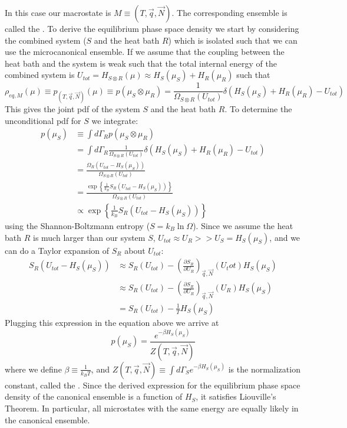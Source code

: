 \documentclass[12pt, a4paper, oneside, openright, titlepage]{book}
\begin{document}
In this case our macrostate is $M \equiv (T,\vec{q},\vec{N})$. The corresponding ensemble is called the . To derive the equilibrium phase space density we start by considering the combined system ($S$ and the heat bath $R$) which is isolated such that we can use the microcanonical ensemble. If we assume that the coupling between the heat bath and the system is weak such that the total internal energy of the combined system is $U_{tot} = H_{S\otimes R}(\mu) \approx H_S(\mu_S) + H_R(\mu_R)$ such that \begin{equation*}
    \rho_{eq,M}(\mu) \equiv p_{(T,\vec{q},\vec{N})}(\mu) \equiv p(\mu_S\otimes\mu_R) = \frac{1}{\Omega_{S\otimes R}(U_{tot})}\delta(H_S(\mu_S)+H_R(\mu_R)-U_{tot})
\end{equation*}
This gives the joint pdf of the system $S$ and the heat bath $R$. To determine the unconditional pdf for $S$ we integrate: \begin{align*}
    p(\mu_S) &\equiv \int d\Gamma_Rp(\mu_S\otimes\mu_R) \\
    &= \int d\Gamma_R \frac{1}{\Omega_{S\otimes R}(U_{tot})}\delta(H_S(\mu_S)+H_R(\mu_R)-U_{tot}) \\
    &= \frac{\Omega_R(U_{tot} - H_S(\mu_S))}{\Omega_{S\otimes R}(U_{tot})} \\ 
    &= \frac{\exp\left\{\frac{1}{k_B}S_R(U_{tot}-H_S(\mu_S))\right\}}{\Omega_{S\otimes R}(U_{tot})}  \\
    &\propto\exp\left\{\frac{1}{k_B}S_R(U_{tot}-H_S(\mu_S))\right\}
\end{align*}
using the Shannon-Boltzmann entropy ($S = k_B\ln\Omega$). Since we assume the heat bath $R$ is much larger than our system $S$, $U_{tot} \approx U_R >> U_S = H_S(\mu_S)$, and we can do a Taylor expansion of $S_R$ about $U_{tot}$: \begin{align*}
    S_R(U_{tot}-H_S(\mu_S)) &\approx S_R(U_{tot}) - \left(\frac{\partial S_R}{\partial U_R}\right)_{\vec{q},\vec{N}}(U_tot) H_S(\mu_S) \\
    &\approx S_R(U_{tot}) - \left(\frac{\partial S_R}{\partial U_R}\right)_{\vec{q},\vec{N}}(U_R)H_S(\mu_S) \\
    &= S_R(U_{tot}) - \frac{1}{T}H_S(\mu_S)
\end{align*}
Plugging this expression in the equation above we arrive at \begin{equation*}
    p(\mu_S) = \frac{e^{-\beta H_S(\mu_S)}}{Z(T,\vec{q},\vec{N})}
\end{equation*}
where we define $\beta \equiv \frac{1}{k_BT}$, and $Z(T,\vec{q},\vec{N}) \equiv \int d\Gamma_Se^{-\beta H_S(\mu_S)}$ is the normalization constant, called the . Since the derived expression for the equilibrium phase space density of the canonical ensemble is a function of $H_S$, it satisfies Liouville's Theorem. In particular, all microstates with the same energy are equally likely in the canonical ensemble.
\end{document}

